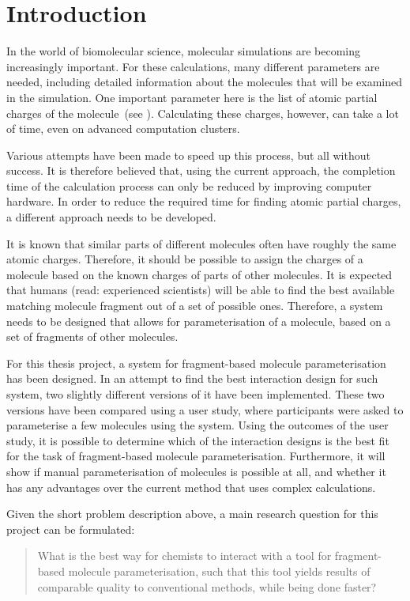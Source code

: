 \chapter{Introduction}

In the world of biomolecular science, molecular simulations are becoming increasingly important. For these calculations, many different parameters are needed, including detailed information about the molecules that will be examined in the simulation. One important parameter here is the list of atomic partial charges of the molecule~(see ). Calculating these charges, however, can take a lot of time, even on advanced computation clusters.

Various attempts have been made to speed up this process, but all without success. It is therefore believed that, using the current approach, the completion time of the calculation process can only be reduced by improving computer hardware. In order to reduce the required time for finding atomic partial charges, a different approach needs to be developed.

It is known that similar parts of different molecules often have roughly the same atomic charges. Therefore, it should be possible to assign the charges of a molecule based on the known charges of parts of other molecules. It is expected that humans (read: experienced scientists) will be able to find the best available matching molecule fragment out of a set of possible ones. Therefore, a system needs to be designed that allows for parameterisation of a molecule, based on a set of fragments of other molecules.

For this thesis project, a system for fragment-based molecule parameterisation has been designed. In an attempt to find the best interaction design for such system, two slightly different versions of it have been implemented. These two versions have been compared using a user study, where participants were asked to parameterise a few molecules using the system. Using the outcomes of the user study, it is possible to determine which of the interaction designs is the best fit for the task of fragment-based molecule parameterisation. Furthermore, it will show if manual parameterisation of molecules is possible at all, and whether it has any advantages over the current method that uses complex calculations.

Given the short problem description above, a main research question for this project can be formulated:
\begin{quote}
What is the best way for chemists to interact with a tool for fragment-based molecule parameterisation, such that this tool yields results of comparable quality to conventional methods, while being done faster?
\end{quote}


